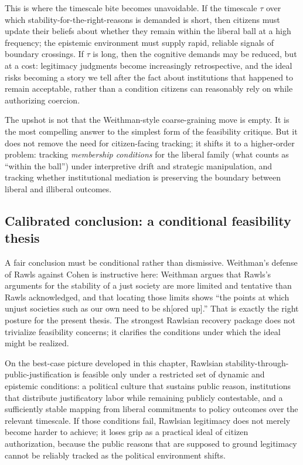 \documentclass[12pt]{report}
\begin{document}
This is where the timescale bite becomes unavoidable. If the timescale $\tau$ over which stability-for-the-right-reasons is demanded is short, then citizens must update their beliefs about whether they remain within the liberal ball at a high frequency; the epistemic environment must supply rapid, reliable signals of boundary crossings. If $\tau$ is long, then the cognitive demands may be reduced, but at a cost: legitimacy judgments become increasingly retrospective, and the ideal risks becoming a story we tell after the fact about institutions that happened to remain acceptable, rather than a condition citizens can reasonably rely on while authorizing coercion.

The upshot is not that the Weithman-style coarse-graining move is empty. It is the most compelling answer to the simplest form of the feasibility critique. But it does not remove the need for citizen-facing tracking; it shifts it to a higher-order problem: tracking \emph{membership conditions} for the liberal family (what counts as ``within the ball'') under interpretive drift and strategic manipulation, and tracking whether institutional mediation is preserving the boundary between liberal and illiberal outcomes.

\subsection{Calibrated conclusion: a conditional feasibility thesis}

A fair conclusion must be conditional rather than dismissive. Weithman’s defense of Rawls against Cohen is instructive here: Weithman argues that Rawls’s arguments for the stability of a just society are more limited and tentative than Rawls acknowledged, and that locating those limits shows ``the points at which unjust societies such as our own need to be sh[ored up].'' \parencite[p.~1187]{Weithman2024Rescuing} That is exactly the right posture for the present thesis. The strongest Rawlsian recovery package does not trivialize feasibility concerns; it clarifies the conditions under which the ideal might be realized.

On the best-case picture developed in this chapter, Rawlsian stability-through-public-justification is feasible only under a restricted set of dynamic and epistemic conditions: a political culture that sustains public reason, institutions that distribute justificatory labor while remaining publicly contestable, and a sufficiently stable mapping from liberal commitments to policy outcomes over the relevant timescale. If those conditions fail, Rawlsian legitimacy does not merely become harder to achieve; it loses grip as a practical ideal of citizen authorization, because the public reasons that are supposed to ground legitimacy cannot be reliably tracked as the political environment shifts.
\end{document}
